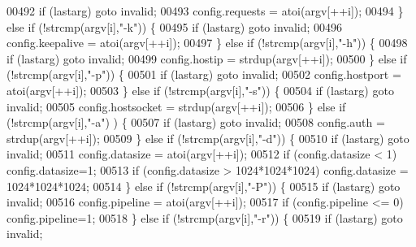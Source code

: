 \begin{DoxyCode}
{{{{{{{{{{{{{{{{{00492             \textcolor{keywordflow}{if} (lastarg) \textcolor{keywordflow}{goto} invalid;
00493             config.requests = atoi(argv[++i]);
00494         \} \textcolor{keywordflow}{else} \textcolor{keywordflow}{if} (!strcmp(argv[i],\textcolor{stringliteral}{"-k"})) \{
00495             \textcolor{keywordflow}{if} (lastarg) \textcolor{keywordflow}{goto} invalid;
00496             config.keepalive = atoi(argv[++i]);
00497         \} \textcolor{keywordflow}{else} \textcolor{keywordflow}{if} (!strcmp(argv[i],\textcolor{stringliteral}{"-h"})) \{
00498             \textcolor{keywordflow}{if} (lastarg) \textcolor{keywordflow}{goto} invalid;
00499             config.hostip = strdup(argv[++i]);
00500         \} \textcolor{keywordflow}{else} \textcolor{keywordflow}{if} (!strcmp(argv[i],\textcolor{stringliteral}{"-p"})) \{
00501             \textcolor{keywordflow}{if} (lastarg) \textcolor{keywordflow}{goto} invalid;
00502             config.hostport = atoi(argv[++i]);
00503         \} \textcolor{keywordflow}{else} \textcolor{keywordflow}{if} (!strcmp(argv[i],\textcolor{stringliteral}{"-s"})) \{
00504             \textcolor{keywordflow}{if} (lastarg) \textcolor{keywordflow}{goto} invalid;
00505             config.hostsocket = strdup(argv[++i]);
00506         \} \textcolor{keywordflow}{else} \textcolor{keywordflow}{if} (!strcmp(argv[i],\textcolor{stringliteral}{"-a"}) ) \{
00507             \textcolor{keywordflow}{if} (lastarg) \textcolor{keywordflow}{goto} invalid;
00508             config.auth = strdup(argv[++i]);
00509         \} \textcolor{keywordflow}{else} \textcolor{keywordflow}{if} (!strcmp(argv[i],\textcolor{stringliteral}{"-d"})) \{
00510             \textcolor{keywordflow}{if} (lastarg) \textcolor{keywordflow}{goto} invalid;
00511             config.datasize = atoi(argv[++i]);
00512             \textcolor{keywordflow}{if} (config.datasize < 1) config.datasize=1;
00513             \textcolor{keywordflow}{if} (config.datasize > 1024*1024*1024) config.datasize = 1024*1024*1024;
00514         \} \textcolor{keywordflow}{else} \textcolor{keywordflow}{if} (!strcmp(argv[i],\textcolor{stringliteral}{"-P"})) \{
00515             \textcolor{keywordflow}{if} (lastarg) \textcolor{keywordflow}{goto} invalid;
00516             config.pipeline = atoi(argv[++i]);
00517             \textcolor{keywordflow}{if} (config.pipeline <= 0) config.pipeline=1;
00518         \} \textcolor{keywordflow}{else} \textcolor{keywordflow}{if} (!strcmp(argv[i],\textcolor{stringliteral}{"-r"})) \{
00519             \textcolor{keywordflow}{if} (lastarg) \textcolor{keywordflow}{goto} invalid;
}}}}}}}}}}}}}}}}}
\end{DoxyCode}
